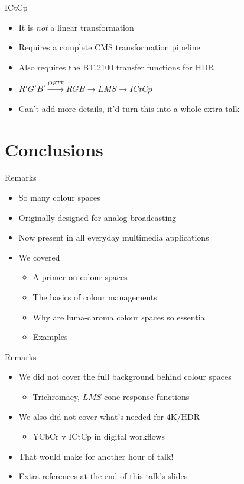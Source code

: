 \documentclass[aspectratio=169,handout,usepdftitle=false]{fireshonks}
\begin{document}
\begin{frame}{ICtCp}
    \begin{itemize}
        \item It is \emph{not} a linear transformation
        \item Requires a complete CMS transformation pipeline
        \item Also requires the BT.2100 transfer functions for HDR
        \item $R'G'B' \xrightarrow{OETF} RGB \to LMS \to ICtCp$
        \item Can't add more details, it'd turn this into a whole extra talk 
    \end{itemize}
\end{frame}
\section{Conclusions}
\begin{frame}{Remarks}
    \begin{itemize}
        \item So many colour spaces
        \item Originally designed for analog broadcasting
        \item Now present in all everyday multimedia applications
        \item We covered
              \begin{itemize}
                  \item A primer on colour spaces
                  \item The basics of colour managements
                  \item Why are luma-chroma colour spaces so essential
                  \item Examples
              \end{itemize}
    \end{itemize}
\end{frame}
\begin{frame}{Remarks}
    \begin{itemize}
        \item We did not cover the full background behind colour spaces
        \begin{itemize}
            \item Trichromacy, $LMS$ cone response functions
        \end{itemize}
        \item We also did not cover what's needed for 4K/HDR
        \begin{itemize}
            \item YCbCr v ICtCp in digital workflows
        \end{itemize}
        \item That would make for another hour of talk!
        \item Extra references at the end of this talk's slides
    \end{itemize}
\end{frame}
\end{document}
